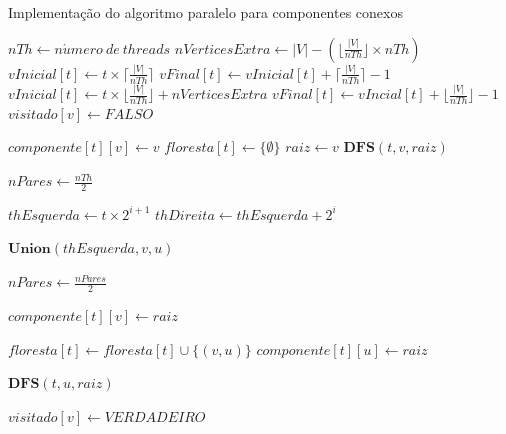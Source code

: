 \documentclass[12pt]{article}
\begin{document}
{\color{gray}\lipsum[1]}

\begin{algorithm}[h]
    \DontPrintSemicolon
    \caption{Implementação do algoritmo paralelo para componentes conexos}
    {
        $nTh \gets n\acute{u}mero\ de\ threads$\;
        $nVerticesExtra \gets |V| - (\lfloor \frac{|V|}{nTh} \rfloor \times nTh)$\;
        {
            {
                $vInicial[t] \gets t \times \lceil \frac{|V|}{nTh} \rceil$\;
                $vFinal[t] \gets vInicial[t] + \lceil \frac{|V|}{nTh} \rceil - 1$\;
            }
           {
                $vInicial[t] \gets t \times \lfloor \frac{|V|}{nTh} \rfloor + nVerticesExtra$\;
                $vFinal[t] \gets vIncial[t] + \lfloor \frac{|V|}{nTh} \rfloor - 1$\;
            }
        }
        {
            $visitado[v] \gets FALSO$\;
        }
        {
        
            {
                $componente[t][v] \gets v$\;
            }
            $floresta[t] \gets \{\emptyset\}$\;
            {
                {
                    $raiz \gets v$\;
                    $\textbf{DFS}(t,v,raiz)$\;
                }
            }
        }
        $nPares \gets \frac{nTh}{2}$\;
        {
            {
                $thEsquerda \gets t \times 2^{i+1}$\;
                $thDireita \gets thEsquerda + 2^i$\;
                
                {
                    $\textbf{Union}(thEsquerda,v,u)$\;
                }
            }
            $nPares \gets \frac{nPares}{2}$\;
        }
    }
    {
        $componente[t][v] \gets raiz$\;
        
        {
            $floresta[t] \gets floresta[t] \cup \{(v,u)\}$\;
            $componente[t][u] \gets raiz$\;
            
            {
                {
                    $\textbf{DFS}(t,u,raiz)$\;
                }
            }
        }
        $visitado[v] \gets VERDADEIRO$\;
    }
\end{algorithm}
    
\end{document}
